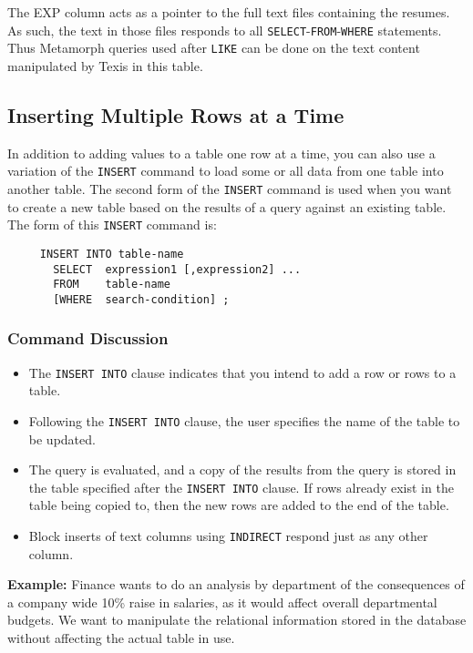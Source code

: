 The EXP column acts as a pointer to the full text files containing the
resumes.  As such, the text in those files responds to all
\verb`SELECT`-\verb`FROM`-\verb`WHERE` statements.  Thus Metamorph queries used after \verb`LIKE`
can be done on the text content manipulated by Texis in this table.

\subsection{Inserting Multiple Rows at a Time}

In addition to adding values to a table one row at a time, you can
also use a variation of the \verb`INSERT` command to load some or all data
from one table into another table.  The second form of the \verb`INSERT`
command is used when you want to create a new table based on the
results of a query against an existing table.  The form of this \verb`INSERT`
command is:
\begin{verbatim}
     INSERT INTO table-name
       SELECT  expression1 [,expression2] ...
       FROM    table-name
       [WHERE  search-condition] ;
\end{verbatim}

\subsubsection{Command Discussion}

\begin{itemize}
\item The {\tt INSERT INTO} clause indicates that you intend to add a row or
rows to a table.

\item Following the {\tt INSERT INTO} clause, the user specifies the name of
the table to be updated.

\item The query is evaluated, and a copy of the results from the query
is stored in the table specified after the {\tt INSERT INTO} clause.  If
rows already exist in the table being copied to, then the new rows are
added to the end of the table.

\item Block inserts of text columns using \verb`INDIRECT` respond just as any
other column.
\end{itemize}

{\bf Example:}
Finance wants to do an analysis by department of the consequences of a
company wide 10\% raise in salaries, as it would affect overall
departmental budgets.  We want to manipulate the relational
information stored in the database without affecting the actual table
in use.

